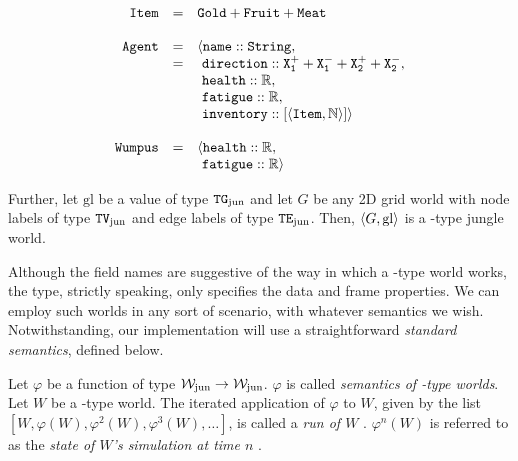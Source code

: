 \begin{definition}[\wjun]
$$
	\begin{array}{r c l}
		\mathtt{Item} & = & \mathtt{Gold + Fruit + Meat}\\
		\\
		\mathtt{Agent} & = & \langle \mathtt{name} :: \mathtt{String},\\ 
					 & = & \ \mathtt{direction} :: \mathtt{X_1^+ + X_1^- + X_2^+ + X_2^-},\\
					 &   & \ \mathtt{health} :: \mathbb{R},\\
					 &   & \ \mathtt{fatigue} :: \mathbb{R},\\
					 &   & \ \mathtt{inventory} :: [\mathtt{\langle Item, \mathbb{N} \rangle}] \rangle
		\\
		\\
		\mathtt{Wumpus} & = & \langle \mathtt{health} :: \mathbb{R},\\
					  &   & \ \mathtt{fatigue} :: \mathbb{R}\rangle
	\end{array}
$$

Further, let $\mathrm{gl}$ be a value of type $\mathtt{TG}_{\mathrm{jun}}$ and let $G$ be any 2D grid world with node labels of type $\mathtt{TV}_{\mathrm{jun}}$ and edge labels of type $\mathtt{TE}_{\mathrm{jun}}$. Then, $\langle G, \mathrm{gl} \rangle$ is a \wjun-type jungle world.
\end{definition}

Although the field names are suggestive of the way in which a \wjun-type world works, the type, strictly speaking, only specifies the data and frame properties. We can employ such worlds in any sort of scenario, with whatever semantics we wish. Notwithstanding, our implementation will use a straightforward {\em standard semantics}, defined below.

\begin{definition}
Let $\varphi$ be a function of type $\mathcal{W}_{\mathrm{jun}} \rightarrow \mathcal{W}_{\mathrm{jun}}$. $\varphi$ is called {\em semantics of \wjun-type worlds}.
Let $W$ be a \wjun-type world. The iterated application of $\varphi$ to $W$, given by the list ${[W, \varphi(W), \varphi^2(W), \varphi^3(W), \dots]}$, is called a {\em run of $W$ }. $\varphi^n(W)$ is referred to as the {\em state of $W$'s simulation at time $n$ }.
\end{definition}

